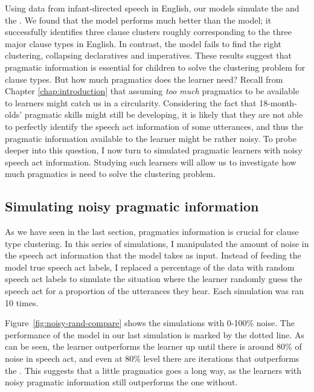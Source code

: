 Using data from infant-directed speech in English, our models simulate the \distlearner{} and the \praglearner{}.
 We found that the \plearnerabbr{} model performs much better than the \dlearnerabbr{} model; it successfully identifies three clause clusters roughly corresponding to the three major clause types in English. In contrast, the \dlearnerabbr{} model fails to find the right clustering, collapsing declaratives and imperatives. These results suggest that pragmatic information is essential for children to solve the clustering problem for clause types. But how much pragmatics does the learner need? Recall from Chapter \ref{chap:introduction} that assuming \emph{too much} pragmatics to be available to learners might catch us in a circularity. Considering the fact that 18-month-olds' pragmatic skills might still be developing, it is likely that they are not able to perfectly identify the speech act information of some utterances, and thus the pragmatic information available to the learner might be rather noisy. To probe deeper into this question, I now turn to simulated pragmatic learners with noisy speech act information. Studying such learners will allow us to investigate how much pragmatics is need to solve the clustering problem. 



\subsection{Simulating noisy pragmatic information} 
\label{sec:engcl:model:noisy}
As we have seen in the last section, pragmatics information is crucial for clause type clustering. In this series of simulations, I manipulated the amount of noise in the speech act information that the \plearnerabbr{} model takes as input. Instead of feeding the model true speech act labels, I replaced a percentage of the data with random speech act labels to simulate the situation where the learner randomly guess the speech act for a proportion of the utterances they hear. Each simulation was ran 10 times. 

Figure~\ref{fig:noisy-rand-compare} shows the simulations with 0-100\% noise. The performance of the \dlearnerabbr{} model in our last simulation is marked by the dotted line. As can be seen, the \plearnerabbr{} learner outperforms the \dlearnerabbr{} learner up until there is around 80\% of noise in speech act, and even at 80\% level there are iterations that outperforms the \dlearnerabbr{}. This suggests that a little pragmatics goes a long way, as the learners with noisy pragmatic information still outperforms the one without. 

